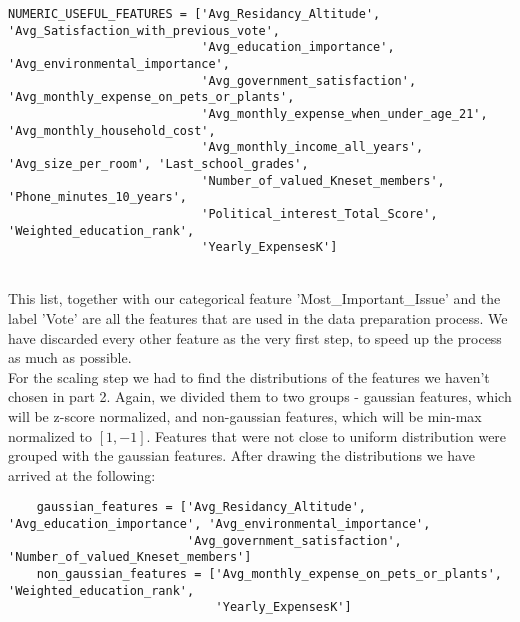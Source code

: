 \documentclass[12pt]{scrartcl}
\begin{document}
\begin{adjustbox}{max width=\linewidth}
\begin{lstlisting}
NUMERIC_USEFUL_FEATURES = ['Avg_Residancy_Altitude', 'Avg_Satisfaction_with_previous_vote',
                           'Avg_education_importance', 'Avg_environmental_importance',
                           'Avg_government_satisfaction', 'Avg_monthly_expense_on_pets_or_plants',
                           'Avg_monthly_expense_when_under_age_21', 'Avg_monthly_household_cost',
                           'Avg_monthly_income_all_years', 'Avg_size_per_room', 'Last_school_grades',
                           'Number_of_valued_Kneset_members', 'Phone_minutes_10_years',
                           'Political_interest_Total_Score', 'Weighted_education_rank',
                           'Yearly_ExpensesK']
\end{lstlisting}
\end{adjustbox}\\

This list, together with our categorical feature 'Most\_Important\_Issue' and the label 'Vote' are all the features that are used in the data preparation process. We have discarded every other feature as the very first step, to speed up the process as much as possible.\\
For the scaling step we had to find the distributions of the features we haven't chosen in part 2. Again, we divided them to two groups - gaussian features, which will be z-score normalized, and non-gaussian features, which will be min-max normalized to $[1, -1]$. Features that were not close to uniform distribution were grouped with the gaussian features. After drawing the distributions we have arrived at the following:\\

\begin{adjustbox}{max width=\linewidth}
\begin{lstlisting}
    gaussian_features = ['Avg_Residancy_Altitude', 'Avg_education_importance', 'Avg_environmental_importance',
                         'Avg_government_satisfaction', 'Number_of_valued_Kneset_members']
    non_gaussian_features = ['Avg_monthly_expense_on_pets_or_plants', 'Weighted_education_rank',
                             'Yearly_ExpensesK']
\end{lstlisting}
\end{adjustbox}\\
\end{document}
